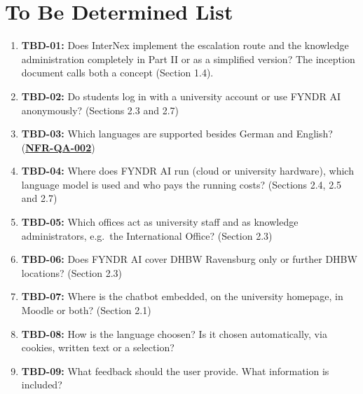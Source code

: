 \documentclass[11pt, a4paper]{article}
\newcommand{\reqref}[1]{\hyperref[req:#1]{\textbf{#1}}}
\begin{document}
\section{To Be Determined List}
\begin{enumerate}
    \item \textbf{TBD-01:} Does InterNex implement the escalation route and the knowledge administration completely in Part II or as a simplified version? The inception document calls both a concept (Section 1.4).
    \item \textbf{TBD-02:} Do students log in with a university account or use FYNDR AI anonymously? (Sections 2.3 and 2.7)
    \item \textbf{TBD-03:} Which languages are supported besides German and English? (\reqref{NFR-QA-002})
    \item \textbf{TBD-04:} Where does FYNDR AI run (cloud or university hardware), which language model is used and who pays the running costs? (Sections 2.4, 2.5 and 2.7)
    \item \textbf{TBD-05:} Which offices act as university staff and as knowledge administrators, e.g.\ the International Office? (Section 2.3)
    \item \textbf{TBD-06:} Does FYNDR AI cover DHBW Ravensburg only or further DHBW locations? (Section 2.3)
    \item \textbf{TBD-07:} Where is the chatbot embedded, on the university homepage, in Moodle or both? (Section 2.1)
    \item \textbf{TBD-08:} How is the language choosen? Is it chosen automatically, via cookies, written text or a selection?
    \item \textbf{TBD-09:} What feedback should the user provide. What information is included?
  
\end{enumerate}
\end{document}
